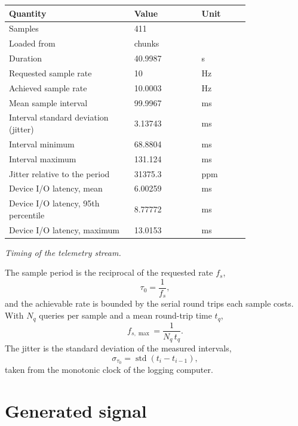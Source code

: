\documentclass[11pt]{article}
\begin{document}
\begin{center}
\begin{tabular}{@{}p{0.52\linewidth}p{0.28\linewidth}l@{}}
\toprule
\textbf{Quantity} & \textbf{Value} & \textbf{Unit} \\
\midrule
Samples & 411 &  \\
Loaded from & chunks &  \\
Duration & 40.9987 & s \\
Requested sample rate & 10 & Hz \\
Achieved sample rate & 10.0003 & Hz \\
Mean sample interval & 99.9967 & ms \\
Interval standard deviation (jitter) & 3.13743 & ms \\
Interval minimum & 68.8804 & ms \\
Interval maximum & 131.124 & ms \\
Jitter relative to the period & 31375.3 & ppm \\
Device I/O latency, mean & 6.00259 & ms \\
Device I/O latency, 95th percentile & 8.77772 & ms \\
Device I/O latency, maximum & 13.0153 & ms \\
\bottomrule
\end{tabular}

\emph{Timing of the telemetry stream.}
\end{center}

The sample period is the reciprocal of the requested rate $f_s$,
\begin{equation}
  \tau_0 = \frac{1}{f_s},
\end{equation}
and the achievable rate is bounded by the serial round trips each sample
costs. With $N_q$ queries per sample and a mean round-trip time $t_q$,
\begin{equation}
  f_{s,\max} = \frac{1}{N_q\,t_q}.
\end{equation}
The jitter is the standard deviation of the measured intervals,
\begin{equation}
  \sigma_{\tau_0} = \operatorname{std}\left(t_i - t_{i-1}\right),
\end{equation}
taken from the monotonic clock of the logging computer.

\section{Generated signal}
\end{document}
